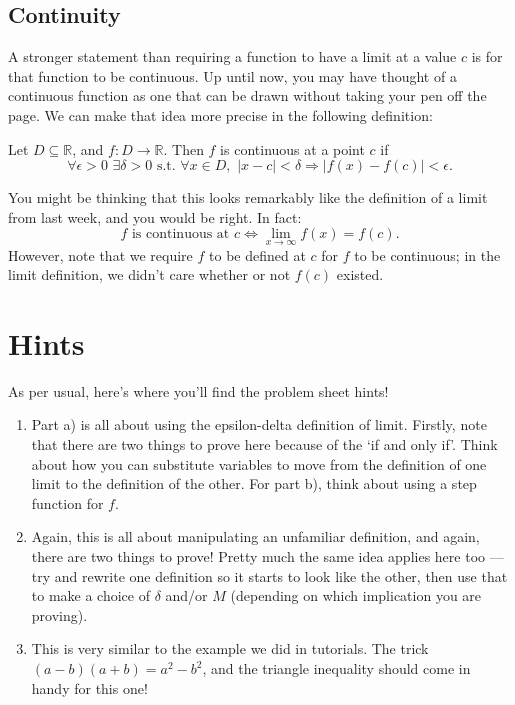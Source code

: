 \documentclass[
  17pt,
  a4paper]{extarticle}
\providecommand{\tightlist}{%
  \setlength{\itemsep}{0pt}\setlength{\parskip}{0pt}}
\theoremstyle{plain}
\theoremstyle{definition}
\theoremstyle{plain}
\theoremstyle{plain}
\theoremstyle{plain}
\theoremstyle{plain}
\theoremstyle{definition}
\theoremstyle{definition}
\theoremstyle{remark}
\theoremstyle{remark}
\let\BeginKnitrBlock\begin \let\EndKnitrBlock\end
\renewcommand{\;}{\,}
\begin{document}
\hypertarget{continuity}{%
\subsection{Continuity}\label{continuity}}

A stronger statement than requiring a function to have a limit at a value \(c\) is for that function to be continuous. Up until now, you may have thought of a continuous function as one that can be drawn without taking your pen off the page. We can make that idea more precise in the following definition:

\BeginKnitrBlock{definition}[Continuity]
{\label{def:def2} }Let \(D \subseteq \mathbb{R}\), and \(f: D \to \mathbb{R}\). Then \(f\) is continuous at a point \(c\) if \[\forall \epsilon > 0\;\;\exists \delta > 0\;\;\text{s.t.}\;\;\forall x \in D,\;\; \lvert x - c \rvert < \delta \Rightarrow \lvert f(x) - f(c) \rvert < \epsilon.\]
\EndKnitrBlock{definition}

You might be thinking that this looks remarkably like the definition of a limit from last week, and you would be right. In fact: \[f\;\;\text{is continuous at}\;\; c \Longleftrightarrow \lim_{x \to \infty}f(x) = f(c).\] However, note that we require \(f\) to be defined at \(c\) for \(f\) to be continuous; in the limit definition, we didn't care whether or not \(f(c)\) existed.

\hypertarget{hints}{%
\section{Hints}\label{hints}}

As per usual, here's where you'll find the problem sheet hints!

\begin{enumerate}
\def\labelenumi{\arabic{enumi})}
\tightlist
\item
  Part a) is all about using the epsilon-delta definition of limit. Firstly, note that there are two things to prove here because of the `if and only if'. Think about how you can substitute variables to move from the definition of one limit to the definition of the other. For part b), think about using a step function for \(f\).
\item
  Again, this is all about manipulating an unfamiliar definition, and again, there are two things to prove! Pretty much the same idea applies here too --- try and rewrite one definition so it starts to look like the other, then use that to make a choice of \(\delta\) and/or \(M\) (depending on which implication you are proving).
\item
  This is very similar to the example we did in tutorials. The trick \((a-b)(a+b) = a^2 - b^2\), and the triangle inequality should come in handy for this one!
\end{enumerate}
\end{document}

